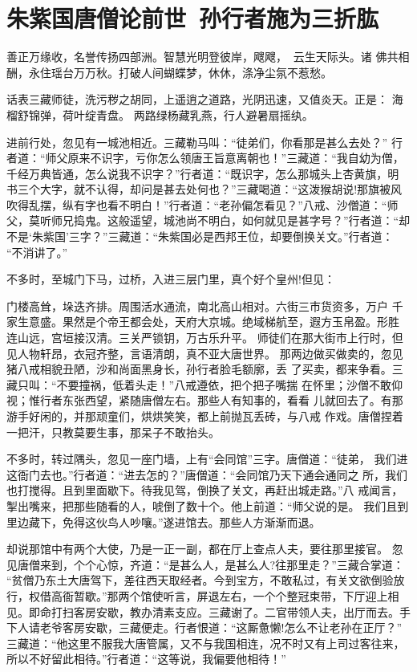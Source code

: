 \chapter{朱紫国唐僧论前世~孙行者施为三折肱}

善正万缘收，名誉传扬四部洲。智慧光明登彼岸，飕飕，云生天际头。诸
佛共相酬，永住瑶台万万秋。打破人间蝴蝶梦，休休，涤净尘氛不惹愁。

话表三藏师徒，洗污秽之胡同，上遥逍之道路，光阴迅速，又值炎天。正是：
海榴舒锦弹，荷叶绽青盘。
两路绿杨藏乳燕，行人避暑扇摇纨。

进前行处，忽见有一城池相近。三藏勒马叫：“徒弟们，你看那是甚么去处？”
行者道：“师父原来不识字，亏你怎么领唐王旨意离朝也！”三藏道：“我自幼为僧，
千经万典皆通，怎么说我不识字？”行者道：“既识字，怎么那城头上杏黄旗，明
书三个大字，就不认得，却问是甚去处何也？”三藏喝道：“这泼猴胡说!那旗被风
吹得乱摆，纵有字也看不明白！”行者道：“老孙偏怎看见？”八戒、沙僧道：“师
父，莫听师兄捣鬼。这般遥望，城池尚不明白，如何就见是甚字号？”行者道：“却
不是‘朱紫国’三字？”三藏道：“朱紫国必是西邦王位，却要倒换关文。”行者道：
“不消讲了。”

不多时，至城门下马，过桥，入进三层门里，真个好个皇州!但见：

门楼高耸，垛迭齐排。周围活水通流，南北高山相对。六街三市货资多，万户
千家生意盛。果然是个帝王都会处，天府大京城。绝域梯航至，遐方玉帛盈。形胜
连山远，宫垣接汉清。三关严锁钥，万古乐升平。
师徒们在那大街市上行时，但见人物轩昂，衣冠齐整，言语清朗，真不亚大唐世界。
那两边做买做卖的，忽见猪八戒相貌丑陋，沙和尚面黑身长，孙行者脸毛额廓，丢
了买卖，都来争看。三藏只叫：“不要撞祸，低着头走！”八戒遵依，把个把子嘴揣
在怀里；沙僧不敢仰视；惟行者东张西望，紧随唐僧左右。那些人有知事的，看看
儿就回去了。有那游手好闲的，并那顽童们，烘烘笑笑，都上前抛瓦丢砖，与八戒
作戏。唐僧捏着一把汗，只教莫要生事，那呆子不敢抬头。

不多时，转过隅头，忽见一座门墙，上有“会同馆”三字。唐僧道：“徒弟，
我们进这衙门去也。”行者道：“进去怎的？”唐僧道：“会同馆乃天下通会通同之
所，我们也打搅得。且到里面歇下。待我见驾，倒换了关文，再赶出城走路。”八
戒闻言，掣出嘴来，把那些随看的人，唬倒了数十个。他上前道：“师父说的是。
我们且到里边藏下，免得这伙鸟人吵嚷。”遂进馆去。那些人方渐渐而退。

却说那馆中有两个大使，乃是一正一副，都在厅上查点人夫，要往那里接官。
忽见唐僧来到，个个心惊，齐道：“是甚么人，是甚么人?往那里走？”三藏合掌道：
“贫僧乃东土大唐驾下，差往西天取经者。今到宝方，不敢私过，有关文欲倒验放
行，权借高衙暂歇。”那两个馆使听言，屏退左右，一个个整冠束带，下厅迎上相
见。即命打扫客房安歇，教办清素支应。三藏谢了。二官带领人夫，出厅而去。手
下人请老爷客房安歇，三藏便走。行者恨道：“这厮惫懒!怎么不让老孙在正厅？”
三藏道：“他这里不服我大唐管属，又不与我国相连，况不时又有上司过客往来，
所以不好留此相待。”行者道：“这等说，我偏要他相待！”

